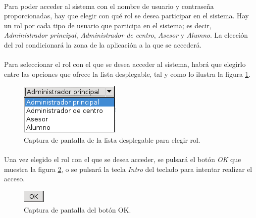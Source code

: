   \paragraph{}Para poder acceder al sistema con el nombre de usuario y
  contraseña proporcionadas, hay que elegir con qué rol se desea participar en
  el sistema. Hay un rol por cada tipo de usuario que participa en el sistema;
  es decir, \textit{Administrador principal}, \textit{Administrador de centro},
  \textit{Asesor} y \textit{Alumno}. La elección del rol condicionará la zona de
  la aplicación a la que se accederá.

  \paragraph{}Para seleccionar el rol con el que se desea acceder al sistema,
  habrá que elegirlo entre las opciones que ofrece la lista desplegable, tal y
  como lo ilustra la figura \ref{capturaListaDesplegableRol}.

  \begin{figure}[!ht]
    \begin{center}
      \includegraphics[scale=0.6]{4.Funcionamiento_Aplicacion/4.2.Acceso_Sistema/Capturas/lista_desplegable_rol.png}
      \caption{Captura de pantalla de la lista desplegable para elegir rol.}
      \label{capturaListaDesplegableRol}
    \end{center}
  \end{figure}

  \paragraph{}Una vez elegido el rol con el que se desea acceder, se pulsará
  el botón \textit{OK} que muestra la figura \ref{capturaBotonOK}, o se pulsará
  la tecla \textit{Intro} del teclado para intentar realizar el acceso.

  \begin{figure}[!ht]
    \begin{center}
      \includegraphics[scale=0.6]{4.Funcionamiento_Aplicacion/4.2.Acceso_Sistema/Capturas/boton_ok.png}
      \caption{Captura de pantalla del botón OK.}
      \label{capturaBotonOK}
    \end{center}
  \end{figure}

